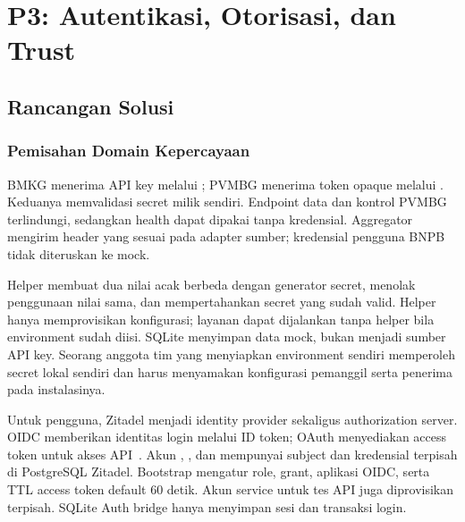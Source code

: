 \chapter[P3: Autentikasi dan Trust]{P3: Autentikasi, Otorisasi, dan Trust}
\section{Rancangan Solusi}
\subsection{Pemisahan Domain Kepercayaan}
BMKG menerima API key melalui ; PVMBG menerima token opaque melalui . Keduanya memvalidasi secret milik sendiri. Endpoint data dan kontrol PVMBG terlindungi, sedangkan health dapat dipakai tanpa kredensial. Aggregator mengirim header yang sesuai pada adapter sumber; kredensial pengguna BNPB tidak diteruskan ke mock.

Helper  membuat dua nilai acak berbeda dengan generator secret, menolak penggunaan nilai sama, dan mempertahankan secret yang sudah valid. Helper hanya memprovisikan konfigurasi; layanan dapat dijalankan tanpa helper bila environment sudah diisi. SQLite menyimpan data mock, bukan menjadi sumber API key. Seorang anggota tim yang menyiapkan environment sendiri memperoleh secret lokal sendiri dan harus menyamakan konfigurasi pemanggil serta penerima pada instalasinya.

Untuk pengguna, Zitadel menjadi identity provider sekaligus authorization server. OIDC memberikan identitas login melalui ID token; OAuth menyediakan access token untuk akses API~\cite{oidc}. Akun , , dan  mempunyai subject dan kredensial terpisah di PostgreSQL Zitadel. Bootstrap mengatur role, grant, aplikasi OIDC, serta TTL access token default 60 detik. Akun service untuk tes API juga diprovisikan terpisah. SQLite Auth bridge hanya menyimpan sesi dan transaksi login.

